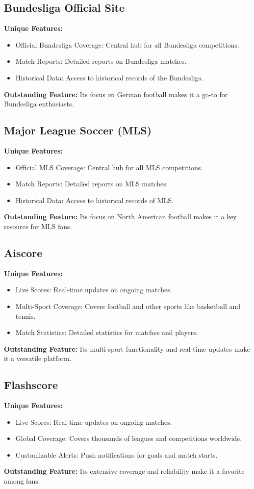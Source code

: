 \subsection{Bundesliga Official Site}
\textbf{Unique Features:}
\begin{itemize}
    \item Official Bundesliga Coverage: Central hub for all Bundesliga competitions.
    \item Match Reports: Detailed reports on Bundesliga matches.
    \item Historical Data: Access to historical records of the Bundesliga.
\end{itemize}
\textbf{Outstanding Feature:} Its focus on German football makes it a go-to for Bundesliga enthusiasts.

\subsection{Major League Soccer (MLS)}
\textbf{Unique Features:}
\begin{itemize}
    \item Official MLS Coverage: Central hub for all MLS competitions.
    \item Match Reports: Detailed reports on MLS matches.
    \item Historical Data: Access to historical records of MLS.
\end{itemize}
\textbf{Outstanding Feature:} Its focus on North American football makes it a key resource for MLS fans.

\subsection{Aiscore}
\textbf{Unique Features:}
\begin{itemize}
    \item Live Scores: Real-time updates on ongoing matches.
    \item Multi-Sport Coverage: Covers football and other sports like basketball and tennis.
    \item Match Statistics: Detailed statistics for matches and players.
\end{itemize}
\textbf{Outstanding Feature:} Its multi-sport functionality and real-time updates make it a versatile platform.

\subsection{Flashscore}
\textbf{Unique Features:}
\begin{itemize}
    \item Live Scores: Real-time updates on ongoing matches.
    \item Global Coverage: Covers thousands of leagues and competitions worldwide.
    \item Customizable Alerts: Push notifications for goals and match starts.
\end{itemize}
\textbf{Outstanding Feature:} Its extensive coverage and reliability make it a favorite among fans.

